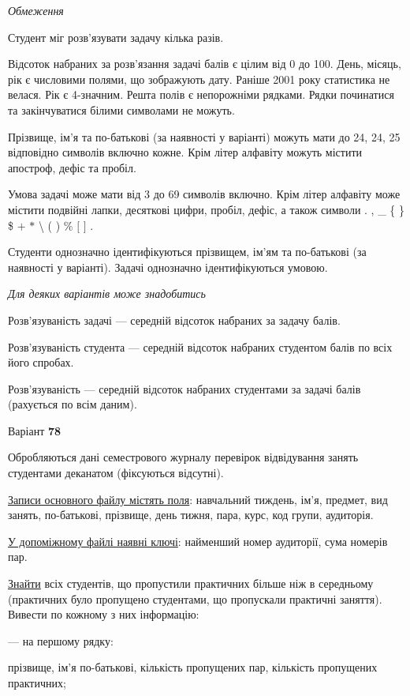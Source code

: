 \documentclass[11pt, ukrainian]{article}
\begin{document}
\bigskip\textit{Обмеження}

Студент міг розв’язувати задачу кілька разів.

Відсоток набраних за розв’язання задачі балів є цілим від 0 до 100.
День, місяць, рік є числовими полями, що зображують дату.
Раніше 2001 року статистика не велася. Рік є 4-значним.
Решта полів є непорожніми рядками.
Рядки починатися та закінчуватися білими символами не можуть.

Прізвище, ім’я та по-батькові (за наявності у варіанті) можуть мати до 24, 24, 25 відповідно символів включно кожне. 
Крім літер алфавіту можуть містити апостроф, дефіс та пробіл.

Умова задачі може мати від 3 до 69 символів включно.
Крім літер алфавіту може містити подвійні лапки, десяткові цифри, пробіл, дефіс,
а також символи . , \_ \{ \} \$ $+$ $*$ {\textbackslash} ( ) \% $[$ $]$ .

Студенти однозначно ідентифікуються прізвищем, ім’ям та по-батькові (за наявності у варіанті).
Задачі однозначно ідентифікуються умовою.

\bigskip\textit{Для деяких варіантів може знадобитись}

Розв'язуваність задачі --- середній відсоток набраних за задачу балів.

Розв'язуваність студента --- середній відсоток набраних студентом балів по всіх його спробах.

Розв'язуваність --- середній відсоток набраних студентами за задачі балів (рахується по всім даним).




\par
\newpage
{\center Варіант  \No \textbf { 78 }\par}
\bigskip
Обробляються дані семестрового журналу перевірок відвідування занять студентами деканатом (фіксуються відсутні). 

\underline{Записи основного файлу містять поля}: навчальний тиждень, ім’я, предмет, вид занять, по-батькові, прізвище, день тижня, пара, курс, код групи, аудиторія.

\underline{У допоміжному файлі наявні ключі}: найменший номер аудиторії, сума номерів пар.

\underline{Знайти} всіх студентів, що пропустили практичних більше ніж в середньому (практичних було пропущено студентами, що пропускали практичні заняття). Вивести по кожному з них інформацію:\par
{\noindent}--- на першому рядку:\par
прізвище, ім’я по-батькові, кількість пропущених пар, кількість пропущених практичних;
\end{document}
